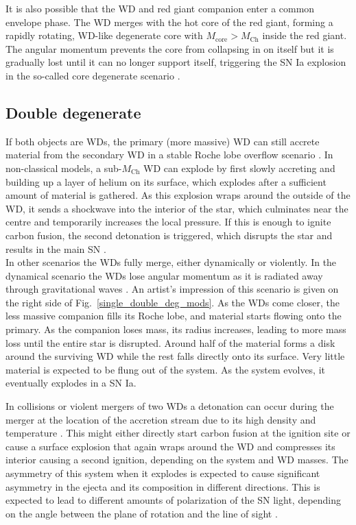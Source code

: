 \documentclass[a4paper,oneside,12pt, class=Latex/Classes/PhDthesisPSnPDF, crop=false]{standalone}
\begin{document}
It is also possible that the WD and red giant companion enter a common envelope phase. The WD merges with the hot core of the red giant, forming a rapidly rotating, WD-like degenerate core with $M_\text{core}>M_\text{Ch}$ inside the red giant. The angular momentum prevents the core from collapsing in on itself but it is gradually lost until it can no longer support itself, triggering the SN Ia explosion in the so-called core degenerate scenario \citep{Kashi_core_deg}.


\subsection{Double degenerate}
If both objects are WDs, the primary (more massive) WD can still accrete material from the secondary WD in a stable Roche lobe overflow scenario \citep{CO_accretion_II, CO_accretion_I}. In non-classical models, a sub-$M_\text{Ch}$ WD can explode by first slowly accreting and building up a layer of helium on its surface, which explodes after a sufficient amount of material is gathered. As this explosion wraps around the outside of the WD, it sends a shockwave into the interior of the star, which culminates near the centre and temporarily increases the local pressure. If this is enough to ignite carbon fusion, the second detonation is triggered, which disrupts the star and results in the main SN \citep{Taam_ddet, Livne_ddet, Shen_ddet, Fink_ddet}.\\

In other scenarios the WDs fully merge, either dynamically or violently. In the dynamical scenario the WDs lose angular momentum as it is radiated away through gravitational waves \citep{Iben_Double_degenerate, Webbink_Double_degenerate}. An artist's impression of this scenario is given on the right side of Fig.~\ref{single_double_deg_mods}. As the WDs come closer, the less massive companion fills its Roche lobe, and material starts flowing onto the primary. As the companion loses mass, its radius increases, leading to more mass loss until the entire star is disrupted. Around half of the material forms a disk around the surviving WD while the rest falls directly onto its surface. Very little material is expected to be flung out of the system. As the system evolves, it eventually explodes in a SN Ia.

In collisions or violent mergers of two WDs a detonation can occur during the merger at the location of the accretion stream due to its high density and temperature \citep{Rosswog_merger, Pakmor_merger, Pakmor_merger2}. This might either directly start carbon fusion at the ignition site or cause a surface explosion that again wraps around the WD and compresses its interior causing a second ignition, depending on the system and WD masses. The asymmetry of this system when it explodes is expected to cause significant asymmetry in the ejecta and its composition in different directions. This is expected to lead to different amounts of polarization of the SN light, depending on the angle between the plane of rotation and the line of sight \citep{Wang_merger_pol, Bulla_merger_pol}.
\end{document}
